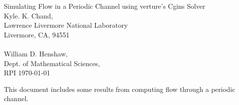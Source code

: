 \documentclass[11pt]{article}
\begin{document}


\def\comma  {~~~,~~}
\newcommand{\uvd}{\mathbf{U}}
\def\ud     {{    U}}
\def\pd     {{    P}}
\def\calo{{\cal O}}

\newcommand{\mbar}{\bar{m}}
\newcommand{\Rbar}{\bar{R}}
\newcommand{\Ru}{R_u}         %
\newcommand{\Div}{\grad\cdot}
\newcommand{\tauv}{\boldsymbol{\tau}}
\newcommand{\thetav}{\boldsymbol{\theta}}

\newcommand{\Omegav}{\boldsymbol{\Omega}}
\newcommand{\omegav}{\boldsymbol{\omega}}
\newcommand{\sigmav}{\boldsymbol{\sigma}}
\newcommand{\cm}{{\rm cm}}

\newcommand{\ds}{\Delta s}
\newcommand{\dsbl}{\ds_{\rm bl}}


\newcommand{\sumi}{\sum_{i=1}^n}
\newcommand{\dt}{{\Delta t}}

\def\ff {\tt} %


\newcommand{\Bc}{{\mathcal B}}
\newcommand{\Dc}{{\mathcal D}}
\newcommand{\Ec}{{\mathcal E}}
\newcommand{\Fc}{{\mathcal F}}
\newcommand{\Gc}{{\mathcal G}}
\newcommand{\Hc}{{\mathcal H}}
\newcommand{\Ic}{{\mathcal I}}
\newcommand{\Jc}{{\mathcal J}}
\newcommand{\Lc}{{\mathcal L}}
\newcommand{\Nc}{{\mathcal N}}
\newcommand{\Pc}{{\mathcal P}}
\newcommand{\Rc}{{\mathcal R}}
\newcommand{\Sc}{{\mathcal S}}

\newcommand{\bogus}[1]{}  %

\vspace{5\baselineskip}
\begin{flushleft}
{\LARGE
Simulating Flow in a Periodic Channel using verture's Cgins Solver\\
}
\vspace{2\baselineskip}
Kyle. K. Chand,    \\
Lawrence Livermore National Laboratory      \\
Livermore, CA, 94551  \\
~ \\
William D. Henshaw, \\
Dept. of Mathematical Sciences, \\
RPI
\vspace{\baselineskip}
\today\\
\vspace{\baselineskip}
\vspace{4\baselineskip}


This document includes some results from computing flow through a periodic channel.

\end{flushleft}
\end{document}
